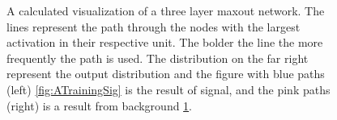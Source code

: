 \begin{figure}
{\begin{subfigure}{.6\textwidth}
        \vspace{-0.5cm}
        \caption{}
        \label{fig:ATrainingBkg}
    \end{subfigure}
    }
    \caption[A calculated visualization of the activation of a three layer maxout network, after training and displaying the
    signal and background separately.]{A calculated visualization of a three layer maxout network. The lines represent the path 
    through the nodes with the largest activation in their respective unit. The bolder the line the more frequently the path is 
    used. The distribution on the far right represent the output distribution and the figure with blue 
    paths (left) \ref{fig:ATrainingSig} is the result of signal, and the pink paths (right) is a result from background 
    \ref{fig:ATrainingBkg}.} 
    \label{fig:NetDist1}
\end{figure}


